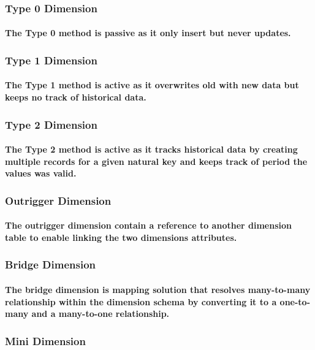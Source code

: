 \subsubsection{Type 0 Dimension}
\paragraph{The Type 0 method is passive as it only insert but never updates.}
\subsubsection{Type 1 Dimension}
\paragraph{The Type 1 method is active as it overwrites old with new data but keeps no track of historical data.}
\subsubsection{Type 2 Dimension}
\paragraph{The Type 2 method is active as it tracks historical data by creating multiple records for a given natural key and keeps track of period the values was valid.}
\subsubsection{Outrigger Dimension}
\paragraph{The outrigger dimension contain a reference to another dimension table to enable linking the two dimensions attributes.}
\subsubsection{Bridge Dimension}
\paragraph{The bridge dimension is mapping solution that resolves many-to-many relationship within the dimension schema by converting it to a one-to-many and a many-to-one relationship.}
\subsubsection{Mini Dimension}
